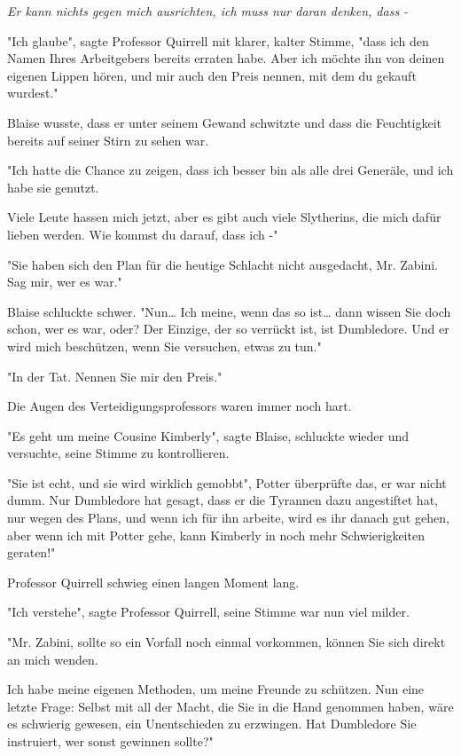 {\emph{Er kann nichts gegen mich ausrichten, ich muss nur daran denken, dass -}

"Ich glaube", sagte Professor Quirrell mit klarer, kalter Stimme, "dass ich den Namen Ihres Arbeitgebers bereits erraten habe. Aber ich möchte ihn von deinen eigenen Lippen hören, und mir auch den Preis nennen, mit dem du gekauft wurdest."

Blaise wusste, dass er unter seinem Gewand schwitzte und dass die Feuchtigkeit bereits auf seiner Stirn zu sehen war.

"Ich hatte die Chance zu zeigen, dass ich besser bin als alle drei Generäle, und ich habe sie genutzt.

Viele Leute hassen mich jetzt, aber es gibt auch viele Slytherins, die mich dafür lieben werden. Wie kommst du darauf, dass ich -"

"Sie haben sich den Plan für die heutige Schlacht nicht ausgedacht, Mr. Zabini. Sag mir, wer es war."

Blaise schluckte schwer. "Nun… Ich meine, wenn das so ist… dann wissen Sie doch schon, wer es war, oder? Der Einzige, der so verrückt ist, ist Dumbledore. Und er wird mich beschützen, wenn Sie versuchen, etwas zu tun."

"In der Tat. Nennen Sie mir den Preis."

Die Augen des Verteidigungsprofessors waren immer noch hart.

"Es geht um meine Cousine Kimberly", sagte Blaise, schluckte wieder und versuchte, seine Stimme zu kontrollieren.

"Sie ist echt, und sie wird wirklich gemobbt", Potter überprüfte das, er war nicht dumm. Nur Dumbledore hat gesagt, dass er die Tyrannen dazu angestiftet hat, nur wegen des Plans, und wenn ich für ihn arbeite, wird es ihr danach gut gehen, aber wenn ich mit Potter gehe, kann Kimberly in noch mehr Schwierigkeiten geraten!"

Professor Quirrell schwieg einen langen Moment lang.

"Ich verstehe", sagte Professor Quirrell, seine Stimme war nun viel milder.

"Mr. Zabini, sollte so ein Vorfall noch einmal vorkommen, können Sie sich direkt an mich wenden.

Ich habe meine eigenen Methoden, um meine Freunde zu schützen. Nun eine letzte Frage: Selbst mit all der Macht, die Sie in die Hand genommen haben, wäre es schwierig gewesen, ein Unentschieden zu erzwingen. Hat Dumbledore Sie instruiert, wer sonst gewinnen sollte?"

}
